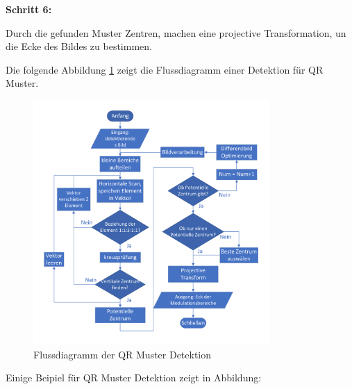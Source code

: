 \textbf{Schritt 6:}

Durch die gefunden Muster Zentren, machen eine projective Transformation, un die Ecke des Bildes zu bestimmen.


Die folgende Abbildung \ref{fig:FlussdiagrammQRMuster} zeigt die Flussdiagramm einer Detektion für QR Muster.

\begin{figure}[htb]
 \centering 
 \includegraphics[keepaspectratio,width=0.8\textwidth]{images/4_ZweiteErfahrung/QRMuster/QR_flussdiagramm.pdf}
 \caption{Flussdiagramm der QR Muster Detektion}
 \label{fig:FlussdiagrammQRMuster}
\end{figure}

Einige Beipiel für QR Muster Detektion zeigt in Abbildung:
